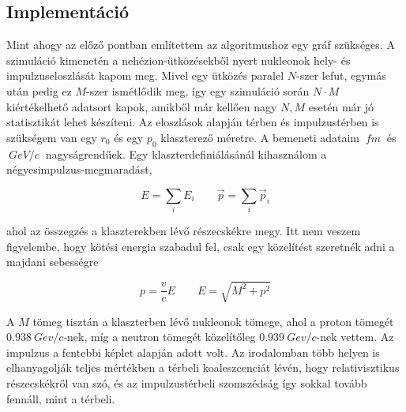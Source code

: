 \documentclass[a4paper,12pt]{article}
\begin{document}
\vspace{5mm}

\subsection{ Implementáció}

\par Mint ahogy az előző pontban említettem az algoritmushoz egy gráf szükséges. A szimuláció kimenetén a nehézion-ütközésekből nyert nukleonok hely- és impulzuseloszlását kapom meg. Mivel egy ütközés paralel $N$-szer lefut, egymás után pedig ez $M$-szer ismétlődik meg, így egy szimuláció során $N\cdot M$ kiértékelhető adatsort kapok, amikből már kellően nagy $N, M$ esetén már jó statisztikát lehet készíteni. Az eloszlások alapján térben és impulzustérben is szükségem van egy $r_{0}$ és egy $p_{0}$ klaszterező méretre. A bemeneti adataim $~fm~$ és $~GeV/c~$ nagyságrendűek. Egy klaszterdefiniálásánál kihasználom a négyesimpulzus-megmaradást, 

\vspace{5mm}

\begin{equation}
	E = \sum_{i} E_{i} \quad \quad \vec{p} = \sum_{i} \vec{p}_{i}
\end{equation} 

\vspace{5mm}

\par ahol az összegzés a klaszterekben lévő részecskékre megy. Itt nem veszem figyelembe, hogy kötési energia szabadul fel, csak egy közelítést szeretnék adni a majdani sebességre

\vspace{5mm}

\begin{equation}
	p = \frac{v}{c} E \quad \quad E = \sqrt{M^{2} + p^{2}}
\end{equation}

\vspace{5mm}

\par A $M$ tömeg tisztán a klaszterben lévő nukleonok tömege, ahol a proton tömegét $0.938 ~Gev/c$-nek, míg a neutron tömegét közelítőleg $0.939 ~Gev/c$-nek vettem. Az impulzus a fentebbi képlet alapján adott volt. Az irodalomban több helyen is elhanyagolják teljes mértékben a térbeli koaleszcenciát lévén, hogy relativisztikus részecskékről van szó, és az impulzustérbeli szomszédság így sokkal tovább fennáll, mint a térbeli.  
\end{document}
